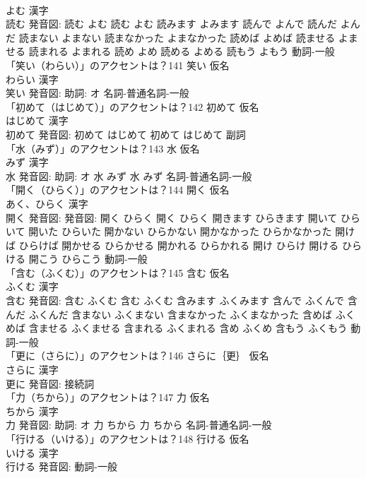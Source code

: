 \documentclass[8pt]{extreport}
\begin{document}
\begin{CJK}{UTF8}{min}
\\	よむ 漢字　
\\	読む 発音図:	読む よむ		読む よむ 読みます よみます 読んで よんで 読んだ よんだ 読まない よまない 読まなかった よまなかった 読めば よめば 読ませる よませる 読まれる よまれる 読め よめ 読める よめる 読もう よもう				動詞-一般 
\\	「笑い（わらい）」のアクセントは？141	笑い 仮名　
\\	わらい 漢字　
\\	笑い 発音図: 助詞: オ							名詞-普通名詞-一般 
\\	「初めて（はじめて）」のアクセントは？142	初めて 仮名　
\\	はじめて 漢字　
\\	初めて 発音図:	初めて はじめて		初めて はじめて				副詞 
\\	「水（みず）」のアクセントは？143	水 仮名　
\\	みず 漢字　
\\	水 発音図: 助詞: オ	水 みず		水 みず				名詞-普通名詞-一般 
\\	「開く（ひらく）」のアクセントは？144	開く 仮名　
\\	あく、ひらく 漢字　
\\	開く 発音図: 発音図:	開く ひらく		開く ひらく 開きます ひらきます 開いて ひらいて 開いた ひらいた 開かない ひらかない 開かなかった ひらかなかった 開けば ひらけば 開かせる ひらかせる 開かれる ひらかれる 開け ひらけ 開ける ひらける 開こう ひらこう				動詞-一般 
\\	「含む（ふくむ）」のアクセントは？145	含む 仮名　
\\	ふくむ 漢字　
\\	含む 発音図:	含む ふくむ		含む ふくむ 含みます ふくみます 含んで ふくんで 含んだ ふくんだ 含まない ふくまない 含まなかった ふくまなかった 含めば ふくめば 含ませる ふくませる 含まれる ふくまれる 含め ふくめ 含もう ふくもう				動詞-一般 
\\	「更に（さらに）」のアクセントは？146	さらに｛更｝ 仮名　
\\	さらに 漢字　
\\	更に 発音図:							接続詞 
\\	「力（ちから）」のアクセントは？147	力 仮名　
\\	ちから 漢字　
\\	力 発音図: 助詞: オ	力 ちから		力 ちから				名詞-普通名詞-一般 
\\	「行ける（いける）」のアクセントは？148	行ける 仮名　
\\	いける 漢字　
\\	行ける 発音図:							動詞-一般 

\end{CJK}
\end{document}
